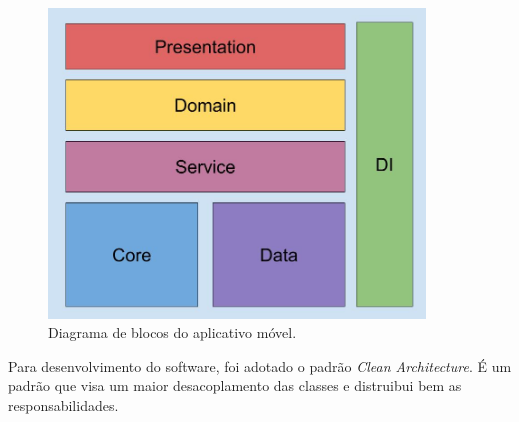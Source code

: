 \documentclass[
	12pt,				%
	oneside,			%
	a4paper,			%
	brazil				%
]{abntex2}
\begin{document}
\begin{figure}[h]
\centering
\includegraphics[width=10cm, center]{images/brick_diagram_beacon}
\caption{Diagrama de blocos do aplicativo móvel.}
\label{Rotulo}
\end{figure}

Para desenvolvimento do software, foi adotado o padrão \textit{Clean Architecture}. É um padrão que visa um maior desacoplamento das classes e distruibui bem as responsabilidades.
\end{document}
